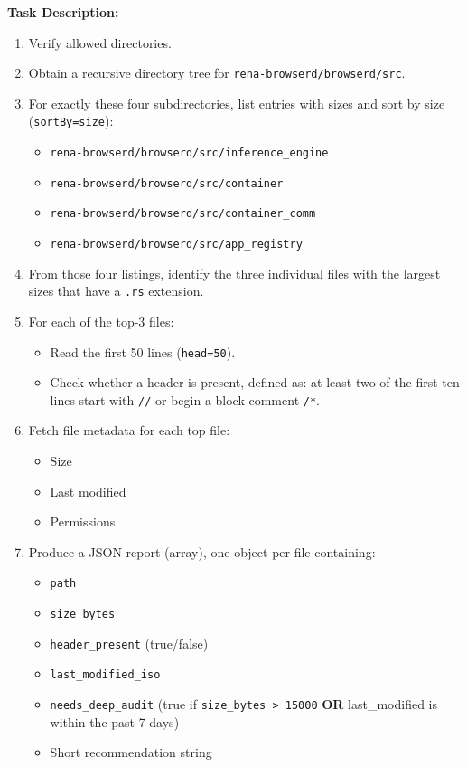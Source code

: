 \begin{ColorBlock}
\ttfamily\small
\textbf{Task Description: }%
\begin{enumerate}
  \item Verify allowed directories.

  \item Obtain a recursive directory tree for \texttt{rena-browserd/browserd/src}.

  \item For exactly these four subdirectories, list entries with sizes and sort by size (\texttt{sortBy=size}):
    \begin{itemize}
      \item \texttt{rena-browserd/browserd/src/inference\_engine}
      \item \texttt{rena-browserd/browserd/src/container}
      \item \texttt{rena-browserd/browserd/src/container\_comm}
      \item \texttt{rena-browserd/browserd/src/app\_registry}
    \end{itemize}

  \item From those four listings, identify the three individual files with the largest sizes that have a \texttt{.rs} extension.

  \item For each of the top-3 files:
    \begin{itemize}
      \item Read the first 50 lines (\texttt{head=50}).
      \item Check whether a header is present, defined as: at least two of the first ten lines start with \texttt{//} or begin a block comment \texttt{/*}.
    \end{itemize}

  \item Fetch file metadata for each top file:
    \begin{itemize}
      \item Size
      \item Last modified
      \item Permissions
    \end{itemize}

  \item Produce a JSON report (array), one object per file containing:
    \begin{itemize}
      \item \texttt{path}
      \item \texttt{size\_bytes}
      \item \texttt{header\_present} (true/false)
      \item \texttt{last\_modified\_iso}
      \item \texttt{needs\_deep\_audit} (true if \texttt{size\_bytes > 15000} \textbf{OR} last\_modified is within the past 7 days)
      \item Short recommendation string
    \end{itemize}
\end{enumerate}


\end{ColorBlock}
